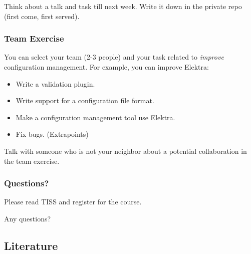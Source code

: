 \documentclass{beamer}
\begin{document}
\begin{assignment}
	\begin{task}
	Think about a talk and task till next week.
	Write it down in the private repo (first come, first served).
	\end{task}
\end{assignment}

\begin{frame}
	\frametitle{Team Exercise}
	You can select your team (2-3 people) and your task related to \emph{improve} configuration management.
	For example, you can improve Elektra:
	\begin{itemize}
		\item Write a validation plugin.
		\item Write support for a configuration file format.
		\item Make a configuration management tool use Elektra.
		\item Fix bugs. (Extrapoints)
	\end{itemize}
\end{frame}

\begin{assignment}
	\begin{task}
	Talk with someone who is not your neighbor about a potential collaboration in the team exercise.
	\end{task}
\end{assignment}

\begin{assignment}
	\frametitle{Questions?}
	\begin{task}
	Please read TISS and register for the course.
	\end{task}

	\begin{task}
	Any questions?
	\end{task}
\end{assignment}



\subsection{Literature}

\nocite{raab2017introducing}

\begin{frame}[allowframebreaks]
	
	
\end{frame}
\end{document}
